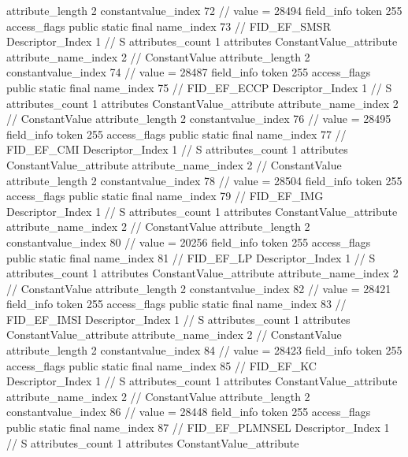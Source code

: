 {{{{{{{					attribute_length	2
					constantvalue_index	72		// value = 28494
				}
				}
			}
			field_info {
				token	255
				access_flags	public static final
				name_index	73		// FID_EF_SMSR
				Descriptor_Index	1		// S
				attributes_count	1
				attributes {
				ConstantValue_attribute {
					attribute_name_index	2		// ConstantValue
					attribute_length	2
					constantvalue_index	74		// value = 28487
				}
				}
			}
			field_info {
				token	255
				access_flags	public static final
				name_index	75		// FID_EF_ECCP
				Descriptor_Index	1		// S
				attributes_count	1
				attributes {
				ConstantValue_attribute {
					attribute_name_index	2		// ConstantValue
					attribute_length	2
					constantvalue_index	76		// value = 28495
				}
				}
			}
			field_info {
				token	255
				access_flags	public static final
				name_index	77		// FID_EF_CMI
				Descriptor_Index	1		// S
				attributes_count	1
				attributes {
				ConstantValue_attribute {
					attribute_name_index	2		// ConstantValue
					attribute_length	2
					constantvalue_index	78		// value = 28504
				}
				}
			}
			field_info {
				token	255
				access_flags	public static final
				name_index	79		// FID_EF_IMG
				Descriptor_Index	1		// S
				attributes_count	1
				attributes {
				ConstantValue_attribute {
					attribute_name_index	2		// ConstantValue
					attribute_length	2
					constantvalue_index	80		// value = 20256
				}
				}
			}
			field_info {
				token	255
				access_flags	public static final
				name_index	81		// FID_EF_LP
				Descriptor_Index	1		// S
				attributes_count	1
				attributes {
				ConstantValue_attribute {
					attribute_name_index	2		// ConstantValue
					attribute_length	2
					constantvalue_index	82		// value = 28421
				}
				}
			}
			field_info {
				token	255
				access_flags	public static final
				name_index	83		// FID_EF_IMSI
				Descriptor_Index	1		// S
				attributes_count	1
				attributes {
				ConstantValue_attribute {
					attribute_name_index	2		// ConstantValue
					attribute_length	2
					constantvalue_index	84		// value = 28423
				}
				}
			}
			field_info {
				token	255
				access_flags	public static final
				name_index	85		// FID_EF_KC
				Descriptor_Index	1		// S
				attributes_count	1
				attributes {
				ConstantValue_attribute {
					attribute_name_index	2		// ConstantValue
					attribute_length	2
					constantvalue_index	86		// value = 28448
				}
				}
			}
			field_info {
				token	255
				access_flags	public static final
				name_index	87		// FID_EF_PLMNSEL
				Descriptor_Index	1		// S
				attributes_count	1
				attributes {
				ConstantValue_attribute {
}}}}}}}
